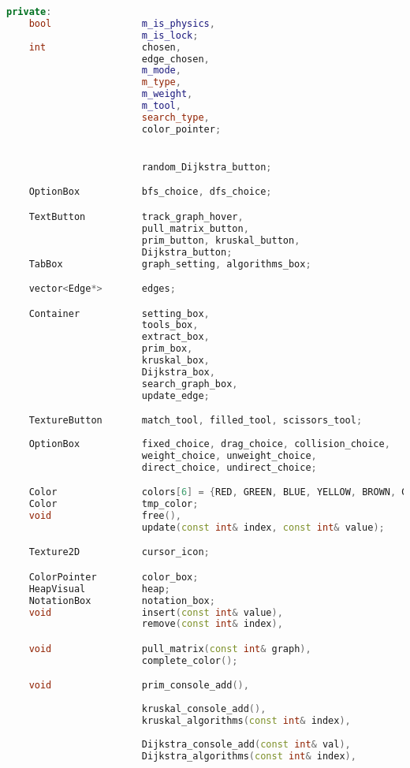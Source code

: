 \begin{lstlisting}[language=C++]
private:
    bool                m_is_physics,
                        m_is_lock;
    int                 chosen, 
                        edge_chosen,
                        m_mode,
                        m_type,
                        m_weight,
                        m_tool,
                        search_type,
                        color_pointer;


                        random_Dijkstra_button;

    OptionBox           bfs_choice, dfs_choice;

    TextButton          track_graph_hover,
                        pull_matrix_button,
                        prim_button, kruskal_button,
                        Dijkstra_button;
    TabBox              graph_setting, algorithms_box;

    vector<Edge*>       edges;

    Container           setting_box, 
                        tools_box, 
                        extract_box, 
                        prim_box, 
                        kruskal_box, 
                        Dijkstra_box,
                        search_graph_box,
                        update_edge;

    TextureButton       match_tool, filled_tool, scissors_tool;
    
    OptionBox           fixed_choice, drag_choice, collision_choice, 
                        weight_choice, unweight_choice, 
                        direct_choice, undirect_choice;

    Color               colors[6] = {RED, GREEN, BLUE, YELLOW, BROWN, GRAY};
    Color               tmp_color;
    void                free(),
                        update(const int& index, const int& value);

    Texture2D           cursor_icon;

    ColorPointer        color_box;
    HeapVisual          heap;
    NotationBox         notation_box;
    void                insert(const int& value),
                        remove(const int& index),

    void                pull_matrix(const int& graph),
                        complete_color();

    void                prim_console_add(),
                        
                        kruskal_console_add(),
                        kruskal_algorithms(const int& index),
                        
                        Dijkstra_console_add(const int& val),
                        Dijkstra_algorithms(const int& index),


\end{lstlisting}
